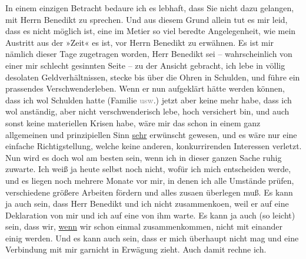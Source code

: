 \pstart
           In einem einzigen Betracht bedaure ich es lebhaft, dass Sie nicht dazu gelangen, mit
               Herrn Benedikt zu sprechen. Und aus diesem
               Grund allein tut es mir leid, dass es nicht möglich ist, eine im Metier so viel
               beredte Angelegenheit, wie mein Austritt aus der »Zeit« es ist, vor Herrn Benedikt zu
               erwähnen. Es ist mir nämlich dieser Tage zugetragen worden, Herr Benedikt sei – wahrscheinlich von einer mir schlecht
               gesinnten Seite – zu der Ansicht gebracht, ich lebe in völlig desolaten
               Geldverhältnissen, stecke bis über die Ohren in Schulden, und führe ein prassendes
               Verschwenderleben. Wenn er nun aufgeklärt hätte werden können, dass ich wol Schulden
               hatte (Familie \textcolor{gray}{usw}.) jetzt aber keine mehr habe, dass ich wol
               anständig, aber nicht verschwenderisch lebe, hoch versichert bin, und auch sonst
               keine materiellen Krisen habe, wäre mir das schon in einem ganz allgemeinen und
               prinzipiellen Sinn \uline{sehr} erwünscht gewesen, und es
               wäre nur eine einfache Richtigstellung, welche keine anderen, konkurrirenden
               Interessen verletzt. Nun wird es doch wol am besten sein, wenn ich in dieser ganzen
               Sache ruhig zuwarte. Ich weiß ja heute selbst {\pb}noch nicht, wofür ich mich
               entscheiden werde, und es liegen noch mehrere Monate vor mir, in denen ich alle
               Umstände prüfen, verschiedene größere Arbeiten fördern und alles zusa{\geminationm}en überlegen muß. Es kann ja auch sein, dass Herr Benedikt und ich nicht zusammenko{\geminationm}en, weil er auf eine Deklaration von mir und ich auf
               eine von ihm warte. Es kann ja auch (so leicht) sein, dass wir, \uline{wenn} wir schon einmal zusammenkommen, nicht mit einander einig werden.
               Und es kann auch sein, dass er mich überhaupt nicht mag und eine Verbindung mit mir
               garnicht in Erwägung zieht. Auch damit rechne ich.\pend
           
